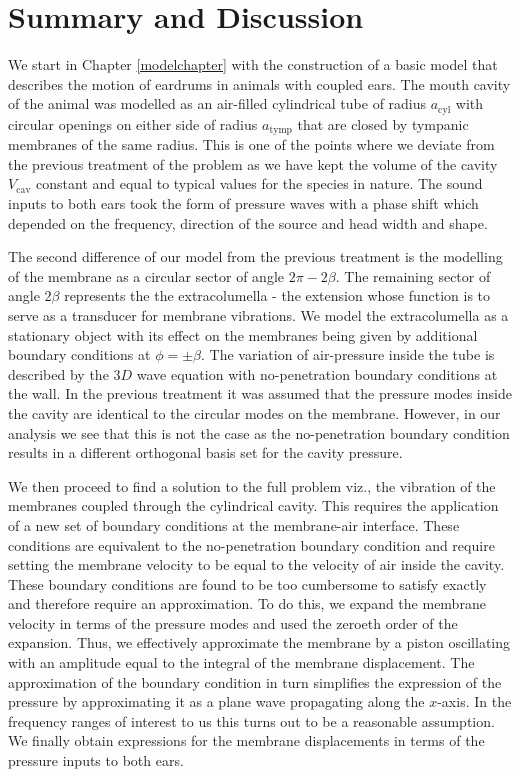 \chapter{Summary and Discussion}
We start in Chapter \ref{modelchapter} with the construction of a basic model that describes the motion of eardrums in animals
with coupled ears. The mouth cavity of the animal was modelled as an air-filled cylindrical tube
of radius $a_{\mathrm{\mathrm{cyl}}}$ with circular openings on either side of radius $a_{\mathrm{tymp}}$ that are closed by
tympanic membranes of the same radius. This is one of the points where we deviate from the previous treatment
of the problem \cite{vossenjasa} as we have kept the volume of the cavity $V_{\mathrm{cav}}$ constant and equal to
typical values for the species in nature. The sound inputs to both ears took the form of pressure waves
with a phase shift which depended on the frequency, direction of the source and head width and shape.

The second difference of our model from the previous treatment is the modelling of the membrane
as a circular sector of angle $2\pi-2\beta$. The remaining sector of angle $2\beta$ represents the 
the extracolumella - the extension whose function is to serve as a transducer for
membrane vibrations. We model the extracolumella as a stationary object with its
effect on the membranes being given by additional boundary conditions at $\phi=\pm\beta$. The variation of air-pressure
inside the tube is described by the $3D$ wave equation with no-penetration boundary conditions at the wall. In the previous
treatment it was assumed that the pressure modes inside the cavity are identical to the circular modes on the membrane. However,
in our analysis we see that this is not the case as the no-penetration boundary condition results in a different orthogonal basis set
for the cavity pressure.

We then proceed to find a solution to the full problem viz., the vibration of the membranes coupled through the cylindrical
cavity. This requires the application of a new set of boundary conditions at the membrane-air interface. These conditions are
equivalent to the no-penetration boundary condition and require setting the membrane velocity to be equal to the velocity of
air inside the cavity. These boundary conditions are found to be too cumbersome to satisfy exactly 
and therefore require an approximation. To do this, we expand the membrane 
velocity in terms of the pressure modes and used the zeroeth order of the expansion. Thus, we effectively approximate the membrane
by a piston oscillating with an amplitude equal to the integral of the membrane displacement. The approximation of the boundary
condition in turn simplifies the expression of the pressure by approximating it as a plane wave propagating along the $x$-axis. In the
frequency ranges of interest to us this turns out to be a reasonable assumption. We finally obtain expressions
for the membrane displacements in terms of the pressure inputs to both ears.

